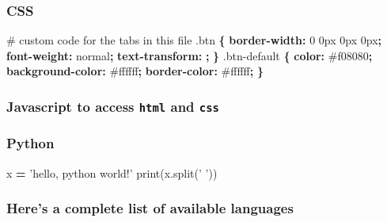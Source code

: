 \documentclass[portrait]{article}
\newenvironment{Shaded}{\begin{snugshade}}{\end{snugshade}}
\newcommand{\KeywordTok}[1]{\textcolor[rgb]{0.13,0.29,0.53}{\textbf{#1}}}
\newcommand{\DataTypeTok}[1]{\textcolor[rgb]{0.13,0.29,0.53}{#1}}
\newcommand{\FloatTok}[1]{\textcolor[rgb]{0.00,0.00,0.81}{#1}}
\newcommand{\StringTok}[1]{\textcolor[rgb]{0.31,0.60,0.02}{#1}}
\newcommand{\OperatorTok}[1]{\textcolor[rgb]{0.81,0.36,0.00}{\textbf{#1}}}
\newcommand{\BuiltInTok}[1]{#1}
\newcommand{\AttributeTok}[1]{\textcolor[rgb]{0.77,0.63,0.00}{#1}}
\newcommand{\NormalTok}[1]{#1}
\begin{document}
\subsubsection{CSS}\label{css}

\begin{Shaded}
\begin{Highlighting}[]
\NormalTok{# custom code for the tabs in this file}
\FloatTok{.btn} \KeywordTok{\{}
    \KeywordTok{border-width:} \DataTypeTok{0} \DataTypeTok{0px} \DataTypeTok{0px} \DataTypeTok{0px}\KeywordTok{;}
    \KeywordTok{font-weight:} \DataTypeTok{normal}\KeywordTok{;}
    \KeywordTok{text-transform:} \KeywordTok{;}
\KeywordTok{\}}
\FloatTok{.btn-default} \KeywordTok{\{}
    \KeywordTok{color:} \DataTypeTok{#f08080}\KeywordTok{;}
    \KeywordTok{background-color:} \DataTypeTok{#ffffff}\KeywordTok{;}
    \KeywordTok{border-color:} \DataTypeTok{#ffffff}\KeywordTok{;}
\KeywordTok{\}}
\end{Highlighting}
\end{Shaded}

\subsubsection{\texorpdfstring{Javascript to access \texttt{html} and
\texttt{css}}{Javascript to access html and css}}\label{javascript-to-access-html-and-css}

\begin{Shaded}
\end{Shaded}

\subsubsection{Python}\label{python}

\begin{Shaded}
\begin{Highlighting}[]
\NormalTok{x }\OperatorTok{=} \StringTok{'hello, python world!'}
\BuiltInTok{print}\NormalTok{(x.split(}\StringTok{' '}\NormalTok{))}
\end{Highlighting}
\end{Shaded}

\subsubsection{Here's a complete list of available
languages}\label{heres-a-complete-list-of-available-languages}
\end{document}
